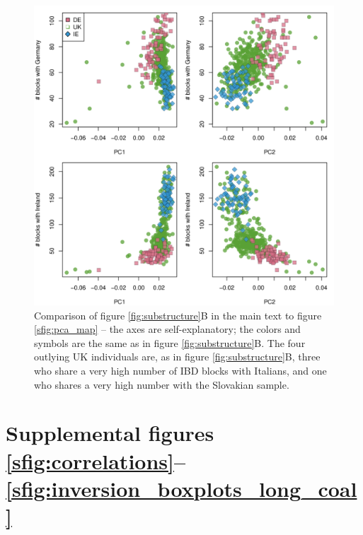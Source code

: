 \documentclass{article}
\begin{document}
\begin{figure}[!htp]
  \begin{center}
    \includegraphics{UK_PCA_vs_IBD}
    \caption{
    Comparison of figure \ref{fig:substructure}B in the main text to figure \ref{sfig:pca_map} --
    the axes are self-explanatory; the colors and symbols are the same as in figure \ref{fig:substructure}B.
    The four outlying UK individuals are, as in figure \ref{fig:substructure}B, 
    three who share a very high number of IBD blocks with Italians,
    and one who shares a very high number with the Slovakian sample.
    \label{sfig:pca_ibd_uk}
    }
  \end{center}
\end{figure}

\section*{Supplemental figures \ref{sfig:correlations}--\ref{sfig:inversion_boxplots_long_coal}}
\end{document}

